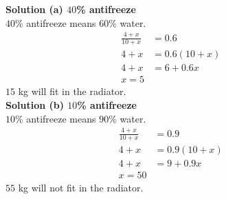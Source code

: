 \textbf{Solution (a) $40$\% antifreeze} \\
$40$\% antifreeze means $60$\% water. \\
\begin{align*}
\frac{4 + x}{10 + x} &= 0.6 && \\
4 + x &= 0.6(10 + x) && \\
4 + x &= 6 + 0.6x && \\
x = 5
\end{align*}
$15$ kg will fit in the radiator. \\
\textbf{Solution (b) $10$\% antifreeze} \\
$10$\% antifreeze means $90$\% water. \\
\begin{align*}
\frac{4 + x}{10 + x} &= 0.9&& \\
4 + x &= 0.9(10 + x) && \\
4 + x &= 9 + 0.9x && \\
x = 50
\end{align*}
$55$ kg will not fit in the radiator. \\